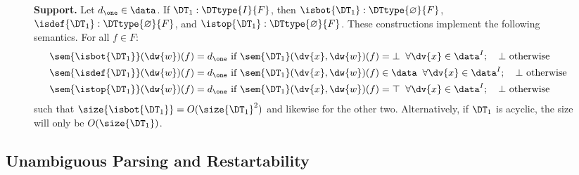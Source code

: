 \begin{figure}[H]
\begin{dtbox}
\textbf{Support.}
Let $d_\one \in \data$.
If $\DT_1: \DTtype{I}{F}$,
then
$\isbot{\DT_1}: \DTtype{\varnothing}{F}$, $\isdef{\DT_1}: \DTtype{\varnothing}{F}$, and $\istop{\DT_1}: \DTtype{\varnothing}{F}$.
These constructions implement the following semantics.
For all $f \in F$:
\begin{align*}
\sem{\isbot{\DT_1}}(\dw{w})(f)
    &= d_{\one} \text{ if } \sem{\DT_1}(\dv{x},\dw{w})(f) = \bot \;\;\forall \dv{x} \in \data^{I}; \quad\bot \text{ otherwise} \\
\sem{\isdef{\DT_1}}(\dw{w})(f)
    &= d_{\one} \text{ if } \sem{\DT_1}(\dv{x},\dw{w})(f) \in \data \;\;\forall \dv{x} \in \data^{I}; \quad\bot \text{ otherwise} \\
\sem{\istop{\DT_1}}(\dw{w})(f)
    &= d_{\one} \text{ if } \sem{\DT_1}(\dv{x},\dw{w})(f) = \top \;\;\forall \dv{x} \in \data^{I}; \quad\bot \text{ otherwise}
\end{align*}
such that $\size{\isbot{\DT_1}} = O(\size{\DT_1}^2)$ and likewise for the other two. Alternatively, if $\DT_1$ is acyclic, the size will only be $O(\size{\DT_1})$.
\end{dtbox}

\label{dt:fig:support}
\end{figure}


\subsection{Unambiguous Parsing and Restartability}
\label{dt:subsec:constructions-restartable}
\label{dt:subsec:restartability}

